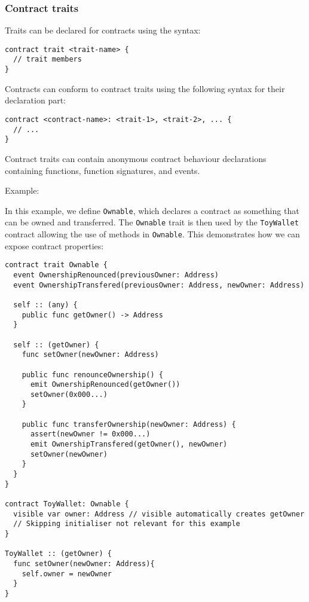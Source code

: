 \subsubsection{Contract traits}
\label{sec:appendix-b-contract-traits}

Traits can be declared for contracts using the syntax:

\begin{verbatim}
contract trait <trait-name> {
  // trait members
}
\end{verbatim}

Contracts can conform to contract traits using the following syntax for their declaration part:

\begin{verbatim}
contract <contract-name>: <trait-1>, <trait-2>, ... {
  // ...
}
\end{verbatim}

Contract traits can contain anonymous contract behaviour declarations containing functions, function signatures, and events.

Example:

In this example, we define \texttt{Ownable}, which declares a contract as something that can be owned and transferred. The \texttt{Ownable} trait is then used by the \texttt{ToyWallet} contract allowing the use of methods in \texttt{Ownable}. This demonstrates how we can expose contract properties:

\begin{verbatim}
contract trait Ownable {
  event OwnershipRenounced(previousOwner: Address)
  event OwnershipTransfered(previousOwner: Address, newOwner: Address)

  self :: (any) {
    public func getOwner() -> Address
  }

  self :: (getOwner) {
    func setOwner(newOwner: Address)

    public func renounceOwnership() {
      emit OwnershipRenounced(getOwner())
      setOwner(0x000...)
    }

    public func transferOwnership(newOwner: Address) {
      assert(newOwner != 0x000...)
      emit OwnershipTransfered(getOwner(), newOwner)
      setOwner(newOwner)
    }
  }
}

contract ToyWallet: Ownable {
  visible var owner: Address // visible automatically creates getOwner
  // Skipping initialiser not relevant for this example
}

ToyWallet :: (getOwner) {
  func setOwner(newOwner: Address){
    self.owner = newOwner
  }
}
\end{verbatim}

